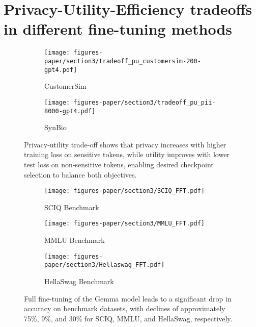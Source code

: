 \section{Privacy-Utility-Efficiency tradeoffs in different fine-tuning methods}
\label{sec:trade_off}

\begin{figure}[t]
    \centering
    \begin{subfigure}{0.49\linewidth}
    \centering
    \texttt{[image: figures-paper/section3/tradeoff\_pu\_customersim-200-gpt4.pdf]}
    \caption{CustomerSim}
    \label{fig:ffta}
    \end{subfigure}
    \begin{subfigure}{0.49\linewidth}
    \centering
    \texttt{[image: figures-paper/section3/tradeoff\_pu\_pii-8000-gpt4.pdf]}
    \caption{SynBio}
    \label{fig:fftb}    
    \end{subfigure}
    \caption{
    Privacy-utility trade-off shows that privacy increases with higher training loss on sensitive tokens, while utility improves with lower test loss on non-sensitive tokens, enabling desired checkpoint selection to balance both objectives.
    }
    \label{fig:fft}
\end{figure}

\begin{figure*}[h!]
    \centering
        \begin{subfigure}{.32\linewidth}
       \texttt{[image: figures-paper/section3/SCIQ\_FFT.pdf]}
        \caption{SCIQ Benchmark}
        \label{fig:sciq_fft}
    \end{subfigure}
    \begin{subfigure}{.32\linewidth}
       \texttt{[image: figures-paper/section3/MMLU\_FFT.pdf]}
        \caption{MMLU Benchmark}
        \label{fig:mmlu_fft}
    \end{subfigure}
     \begin{subfigure}{.32\linewidth}
       \texttt{[image: figures-paper/section3/Hellaswag\_FFT.pdf]}
        \caption{HellaSwag Benchmark}
        \label{fig:hs_fft}
    \end{subfigure}
    \caption{
    Full fine-tuning of the Gemma model leads to a significant drop in accuracy on benchmark datasets, with declines of approximately 75\%, 9\%, and 30\% for SCIQ, MMLU, and HellaSwag, respectively.
    }
    \label{fig:bench-fft}
\end{figure*}

